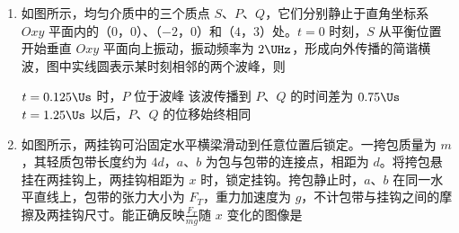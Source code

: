 \begin{enumerate}
\fourchoices[answer=B]
{$ 1.0\Uh $}
{$ 1.5\Uh $}
{$ 2.0\Uh $}
{$ 2.4\Uh $}


\item
如图所示，均匀介质中的三个质点 $ S $、$ P $、$ Q $，它们分别静止于直角坐标系 $ Oxy $ 平面内的（$ 0 $，$ 0 $）、（$ - 2 $，$ 0 $）和（$ 4 $，$ 3 $）处。$ t =0 $ 时刻，$ S $ 从平衡位置开始垂直 $ Oxy $ 平面向上振动，振动频率为 $ 2 \UHz $，形成向外传播的简谐横波，图中实线圆表示某时刻相邻的两个波峰，则 
\begin{figure}[htbp]
	\centering
	
\end{figure}

{$ t =0.125 \Us $ 时，$ P $ 位于波峰}
{该波传播到 $ P $、$ Q $ 的时间差为 $ 0.75 \Us $}
{$ t =1.25 \Us $ 以后，$ P $、$ Q $ 的位移始终相同}


\item
如图所示，两挂钩可沿固定水平横梁滑动到任意位置后锁定。一挎包质量为 $ m $，其轻质包带长度约为 $ 4 d $，$ a $、$ b $ 为包与包带的连接点，相距为 $ d $。将挎包悬挂在两挂钩上，两挂钩相距为 $ x $ 时，锁定挂钩。挎包静止时，$ a $、$ b $ 在同一水平直线上，包带的张力大小为 $ F_{T} $，重力加速度为 $ g $，不计包带与挂钩之间的摩擦及两挂钩尺寸。能正确反映$ \frac{{{F_{T}}}}{{mg}} $随 $ x $ 变化的图像是 

\begin{figure}[htbp]
\centering

\end{figure}
\fourchoices[answer=D,ispicture=true]
{}
{}
{}
{}





\end{enumerate}
